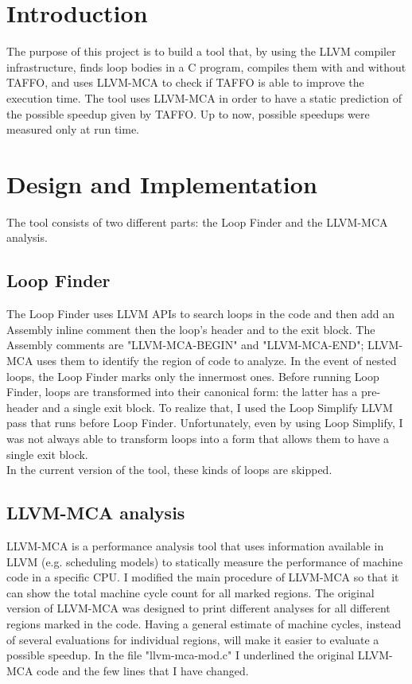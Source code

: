 \section{Introduction}

The purpose of this project is to build a tool that, by using the LLVM compiler infrastructure, finds loop bodies in a C program, compiles them with and without TAFFO, and uses LLVM-MCA to check if TAFFO is able to improve the execution time.
The tool uses LLVM-MCA in order to have a static prediction of the possible speedup given by TAFFO. Up to now, possible speedups were measured only at run time.

\section{Design and Implementation}
The tool consists of two different parts: the Loop Finder and the LLVM-MCA analysis.

\subsection{Loop Finder}
The Loop Finder uses LLVM APIs to search loops in the code and then add an Assembly inline comment then the loop's header and to the exit block.
The Assembly comments are "LLVM-MCA-BEGIN" and "LLVM-MCA-END"; 
 LLVM-MCA uses them to identify the region of code to analyze.
In the event of nested loops, the Loop Finder marks only the innermost ones.
Before running Loop Finder, loops are transformed into their canonical form: the latter has a pre-header and a single exit block. To realize that, I used the Loop Simplify LLVM pass that runs before Loop Finder.
Unfortunately, even by using Loop Simplify, I was not always able to transform loops into a form that allows them to have a single exit block.\\
In the current version of the tool, these kinds of loops are skipped.

\subsection{LLVM-MCA analysis}

LLVM-MCA is a performance analysis tool that uses information available in LLVM (e.g. scheduling models) to statically measure the performance of machine code in a specific CPU.
I modified the main procedure of LLVM-MCA so that it can show the total machine cycle count for all marked regions. The original version of LLVM-MCA was designed to print different analyses for all different regions marked in the code.
Having a general estimate of machine cycles, instead of several evaluations for individual regions, will make it easier to evaluate a possible speedup.
In the file "llvm-mca-mod.c" I underlined the original LLVM-MCA code and the few lines that I have changed.


